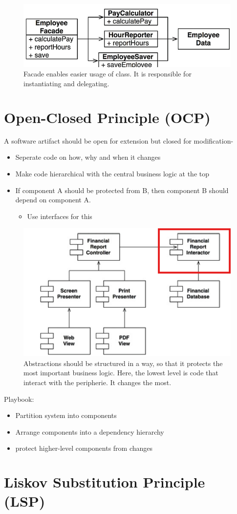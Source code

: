 \documentclass[../Main.tex]{subfiles}
\begin{document}
 \begin{figure}[H]
    \centering
    \includegraphics[width=0.75\linewidth]{Images/cleanarch/employeefacade.png}
    \caption{Facade enables easier usage of class. It is responsible for instantiating and delegating.}
\end{figure}

\section{Open-Closed Principle (OCP)}
    A software artifact should be open for extension but closed for modification-
    \begin{itemize}
        \item Seperate code on how, why and when it changes
        \item Make code hierarchical with the central business logic at the top
        \item If component A should be protected from B, then component B should depend on component A.
            \begin{itemize}
                \item Use interfaces for this
            \end{itemize}
    \end{itemize}

    \begin{figure}[H]
        \centering
        \includegraphics[width=0.75\linewidth]{Images/cleanarch/ocp.png}
        \caption{Abstractions should be structured in a way, so that 
        it protects the most important business logic. Here, the lowest
        level is code that interact with the peripherie. It changes the most.}
    \end{figure}

    Playbook:
    \begin{itemize}
        \item Partition system into components
        \item Arrange components into a dependency hierarchy
        \item protect higher-level components from changes
    \end{itemize}

\section{Liskov Substitution Principle (LSP)}
\end{document}
